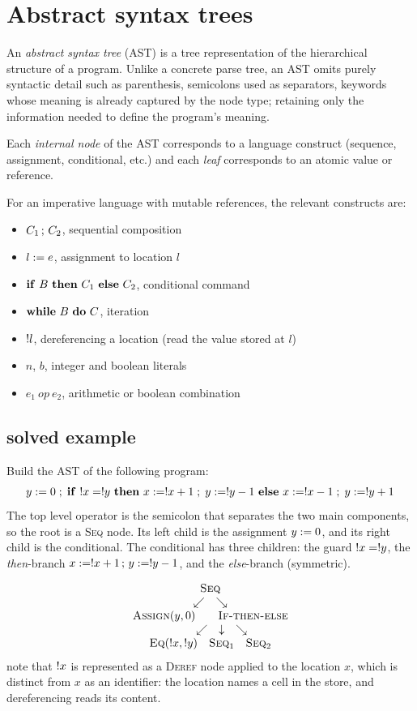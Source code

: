 \section{Abstract syntax trees}
An \textit{abstract syntax tree} (AST) is a tree representation of the hierarchical structure of a program. Unlike a concrete parse tree, an AST omits purely syntactic detail such as parenthesis, semicolons used as separators, keywords whose meaning is already captured by the node type; retaining only the information needed to define the program's meaning.

Each \textit{internal node} of the AST corresponds to a language construct (sequence, assignment, conditional, etc.) and each \textit{leaf} corresponds to an atomic value or reference.

For an imperative language with mutable references, the relevant constructs are:
\begin{itemize}
  \item $C_1 \,;\, C_2$, sequential composition
  \item $l := e$, assignment to location $l$
  \item $\mathbf{if}\ B\ \mathbf{then}\ C_1\ \mathbf{else}\ C_2$, conditional command
  \item $\mathbf{while}\ B\ \mathbf{do}\ C$, iteration
  \item $!l$, dereferencing a location (read the value stored at $l$)
  \item $n$, $b$, integer and boolean literals
  \item $e_1\ \mathit{op}\ e_2$, arithmetic or boolean combination
\end{itemize}

\subsection{solved example}
Build the AST of the following program:
\[
  y := 0\;;\;
  \mathbf{if}\ !x = !y\ \mathbf{then}\ x := !x+1\;;\;y := !y-1\ \mathbf{else}\ x := !x-1\;;\;y := !y+1
\]
The top level operator is the semicolon that separates the two main components, so the root is a \textsc{Seq} node. Its left child is the assignment $y := 0$, and its right child is the conditional. The conditional has three children: the guard $!x=!y$, the \emph{then}-branch $x := !x+1 \,;\, y := !y-1$, and the \emph{else}-branch (symmetric).

\[
\begin{array}{c}
\textsc{Seq} \\
\swarrow \quad \searrow \\
\textsc{Assign}(y,0) \qquad \textsc{If-then-else} \\
\quad\quad\swarrow \quad \downarrow \quad \searrow \\
\textsc{Eq}(!x,!y) \quad \textsc{Seq}_1 \quad \textsc{Seq}_2
\end{array}
\]
note that $!x$ is represented as a \textsc{Deref} node applied to the location $x$, which is distinct from $x$ as an identifier: the location names a cell in the store, and dereferencing reads its content.


